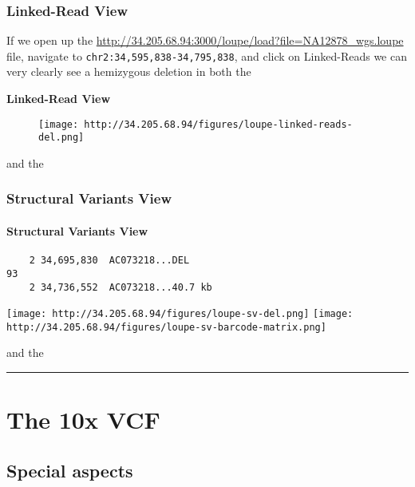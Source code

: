 \documentclass[]{article}
\let\oldparagraph\paragraph
\renewcommand{\paragraph}[1]{\oldparagraph{#1}\mbox{}}
\begin{document}
\subsubsection{\texorpdfstring{\textbf{Linked-Read
View}}{Linked-Read View}}\label{linked-read-view-1}

If we open up the
\url{http://34.205.68.94:3000/loupe/load?file=NA12878_wgs.loupe} file,
navigate to \texttt{chr2:34,595,838-34,795,838}, and click on
Linked-Reads we can very clearly see a hemizygous deletion in both the

\textbf{Linked-Read View}

\begin{figure}[htbp]
\centering
\texttt{[image: http://34.205.68.94/figures/loupe-linked-reads-del.png]}
\caption{}
\end{figure}

and the

\subsubsection{\texorpdfstring{\textbf{Structural Variants
View}}{Structural Variants View}}\label{structural-variants-view}

\paragraph{\texorpdfstring{\textbf{Structural Variants
View}}{Structural Variants View}}\label{structural-variants-view-1}

\begin{verbatim}
    2 34,695,830  AC073218...DEL
93  
    2 34,736,552  AC073218...40.7 kb    
\end{verbatim}

\texttt{[image: http://34.205.68.94/figures/loupe-sv-del.png]}
\texttt{[image: http://34.205.68.94/figures/loupe-sv-barcode-matrix.png]}

and the

\begin{center}\rule{0.5\linewidth}{\linethickness}\end{center}

\section{\texorpdfstring{\textbf{The 10x
VCF}}{The 10x VCF}}\label{the-10x-vcf}

\subsection{Special aspects}\label{special-aspects}
\end{document}
